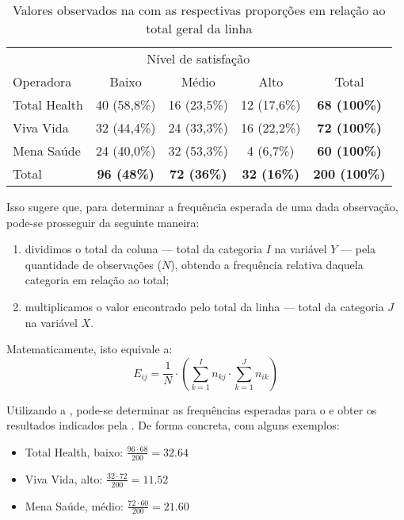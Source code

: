 \begin{sol}
\begin{table}[htpb]
    \centering
    \begin{tabular}{lcccc}
        \toprule
                     & \multicolumn{3}{c}{Nível de satisfação} & \\
                     \cmidrule(lr){2-4}
        Operadora    & Baixo       & Médio       & Alto        & Total \\
        \midrule
        Total Health & 40 (58,8\%) & 16 (23,5\%) & 12 (17,6\%) & \textbf{68 (100\%)} \\
        Viva Vida    & 32 (44,4\%) & 24 (33,3\%) & 16 (22,2\%) & \textbf{72 (100\%)} \\
        Mena Saúde   & 24 (40,0\%) & 32 (53,3\%) & 4 (6,7\%)   & \textbf{60 (100\%)} \\
        Total        & \textbf{96 (48\%)}   & \textbf{72 (36\%)}   & \textbf{32 (16\%)}   & \textbf{200 (100\%)} \\
        \bottomrule
    \end{tabular}
    \caption{Valores observados na  com as respectivas proporções em relação ao total geral da linha}
    \label{tab:satisfacao-operadora-prop-linha}
\end{table}

Isso sugere que, para determinar a frequência esperada de uma dada observação,
pode-se prosseguir da seguinte maneira:
\begin{enumerate}
    \item dividimos o total da coluna --- total da categoria $I$ na variável
    $Y$ --- pela quantidade de observações ($N$), obtendo a frequência relativa
    daquela categoria em relação ao total;
    \item multiplicamos o valor encontrado pelo total da linha --- total da
    categoria $J$ na variável $X$.
\end{enumerate}

Matematicamente, isto equivale a:
\begin{equation}
    E_{ij} = \frac{1}{N} \cdot \left( \sum_{k=1}^{I} n_{kj} \cdot \sum_{k=1}^{J} n_{ik} \right)
    \label{eq:freq-esperada}
\end{equation}

Utilizando a , pode-se determinar as frequências
esperadas para o  e obter os resultados indicados
pela . De forma concreta, com alguns
exemplos:
\begin{itemize}
    \item Total Health, baixo: $\frac{96 \cdot 68}{200}=32.64$
    \item Viva Vida, alto: $\frac{32 \cdot 72}{200}=11.52$
    \item Mena Saúde, médio: $\frac{72 \cdot 60}{200}=21.60$
\end{itemize}


\end{sol}
